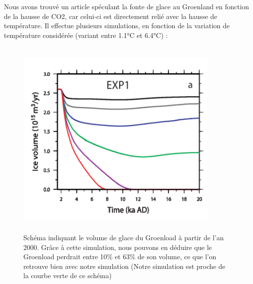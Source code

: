 \documentclass{article}
\begin{document}
\newline
Nous avons trouvé un article \cite{charbit2008amount} spéculant la fonte de glace au Groenland en fonction de la hausse de CO2, car celui-ci est directement relié avec la hausse de température. Il effectue plusieurs simulations, en fonction de la variation de température considérée (variant entre 1.1°C et 6.4°C) : 
\begin{figure}[!htpb]
\centering
\includegraphics[width=10cm, keepaspectratio=true, height=10cm]{Variation.png}
\caption{Schéma indiquant le volume de glace du Groenload à partir de l'an 2000. Grâce à cette simulation, nous pouvons en déduire que le Groenload perdrait entre 10\% et 63\% de son volume, ce que l'on retrouve bien avec notre simulation (Notre simulation est proche de la courbe verte de ce schéma) }
\end{figure}
\newpage



\end{document}

